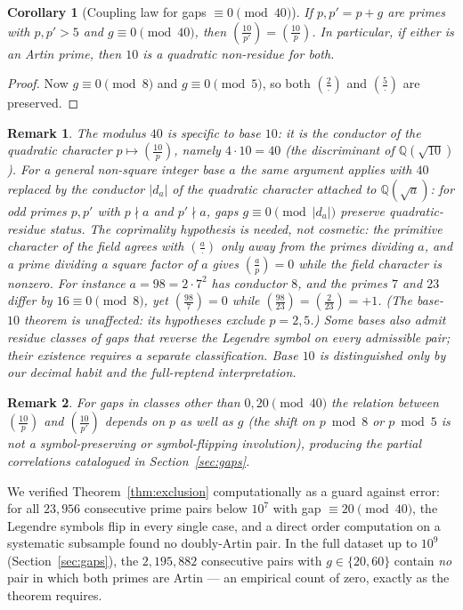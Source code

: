 \documentclass[11pt]{amsart}
\newtheorem{corollary}{Corollary}
\newtheorem{remark}{Remark}
\theoremstyle{definition}
\newcommand{\Lsym}[2]{\left(\tfrac{#1}{#2}\right)}
\begin{document}
\begin{corollary}[Coupling law for gaps $\equiv 0 \pmod{40}$]
	\label{cor:coupling}
	If $p, p' = p + g$ are primes with $p, p' > 5$ and $g \equiv 0 \pmod{40}$, then
	$\Lsym{10}{p'} = \Lsym{10}{p}$. In particular, if either is an Artin prime,
	then $10$ is a quadratic non-residue for both.
\end{corollary}

\begin{proof}
	Now $g \equiv 0 \pmod 8$ and $g \equiv 0 \pmod 5$, so both
	$\Lsym{2}{\cdot}$ and $\Lsym{5}{\cdot}$ are preserved.
\end{proof}

\begin{remark}
	The modulus $40$ is specific to base $10$: it is the conductor of the
	quadratic character $p \mapsto \Lsym{10}{p}$, namely $4 \cdot 10 = 40$ (the
	discriminant of $\mathbb{Q}(\sqrt{10})$). For a general non-square integer base $a$
	the same argument applies with $40$ replaced by the conductor $|d_a|$ of the
	quadratic character attached to $\mathbb{Q}(\sqrt{a})$: for odd primes
	$p, p'$ with $p \nmid a$ and $p' \nmid a$, gaps
	$g \equiv 0 \pmod{|d_a|}$ preserve quadratic-residue status. The
	coprimality hypothesis is needed, not cosmetic: the primitive character of
	the field agrees with $\Lsym{a}{\cdot}$ only away from the primes dividing
	$a$, and a prime dividing a square factor of $a$ gives $\Lsym{a}{p} = 0$
	while the field character is nonzero. For instance $a = 98 = 2 \cdot 7^2$
	has conductor $8$, and the primes $7$ and $23$ differ by $16 \equiv 0
	\pmod 8$, yet $\Lsym{98}{7} = 0$ while $\Lsym{98}{23} = \Lsym{2}{23} = +1$.
	(The base-$10$ theorem is unaffected: its hypotheses exclude $p = 2, 5$.) Some bases also
	admit residue classes of gaps that reverse the Legendre symbol on every
	admissible pair; their existence requires a separate classification.
	Base $10$ is distinguished only by our decimal habit and the
	full-reptend interpretation.
\end{remark}

\begin{remark}
	For gaps in classes other than $0, 20 \pmod{40}$ the relation between
	$\Lsym{10}{p}$ and $\Lsym{10}{p'}$ depends on $p$ as well as $g$ (the shift on
	$p \bmod 8$ or $p \bmod 5$ is not a symbol-preserving or symbol-flipping
	involution), producing the partial correlations catalogued in
	Section~\ref{sec:gaps}.
\end{remark}

We verified Theorem~\ref{thm:exclusion} computationally as a guard against
error: for all $23{,}956$ consecutive prime pairs below $10^7$ with gap
$\equiv 20 \pmod{40}$, the Legendre symbols flip in every single case, and a
direct order computation on a systematic subsample found no doubly-Artin pair.
In the full dataset up to $10^9$ (Section~\ref{sec:gaps}), the
$2{,}195{,}882$ consecutive pairs with $g \in \{20, 60\}$ contain \emph{no}
pair in which both primes are Artin --- an empirical count of zero, exactly as
the theorem requires.
\end{document}
